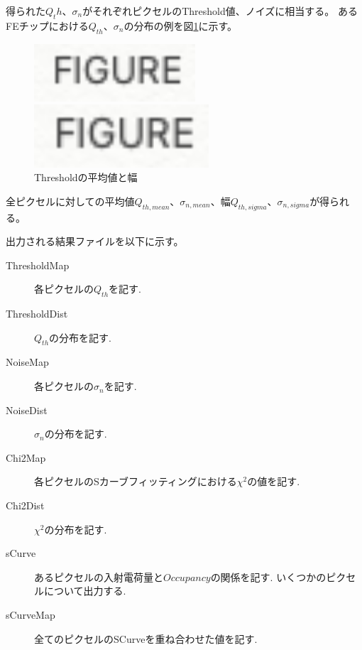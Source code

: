 得られた$Q_th$、$\sigma_n$がそれぞれピクセルのThreshold値、ノイズに相当する。
あるFEチップにおける$Q_{th}$、$\sigma_n$の分布の例を図\ref{threshold_mean_sigma}に示す。

\begin{figure}[bpt]\centering
  \begin{minipage}{0.4\hsize}
    \begin{center}
    \includegraphics[width=60mm]{figure}
    \end{center}
  \end{minipage}
  \begin{minipage}{0.4\hsize}
    \begin{center}
    \includegraphics[width=65mm]{figure}
    \end{center}
  \end{minipage}
  \caption[Thresholdの平均値と幅]{Thresholdの平均値と幅}
  \label{threshold_mean_sigma}
\end{figure}


全ピクセルに対しての平均値$Q_{th,mean}、\sigma_{n,mean}$、幅$Q_{th,sigma}、\sigma_{n,sigma}$が得られる。

出力される結果ファイルを以下に示す。
\begin{description}
  \item [ThresholdMap] 各ピクセルの$Q_{th}$を記す.
  \item [ThresholdDist] $Q_{th}$の分布を記す.
  \item [NoiseMap] 各ピクセルの$\sigma_n$を記す.
  \item [NoiseDist] $\sigma_n$の分布を記す. 
  \item [Chi2Map] 各ピクセルのSカーブフィッティングにおける$\chi^2$の値を記す.
  \item [Chi2Dist] $\chi^2$の分布を記す.
  \item [sCurve] あるピクセルの入射電荷量と$Occupancy$の関係を記す. いくつかのピクセルについて出力する.
  \item [sCurveMap] 全てのピクセルのSCurveを重ね合わせた値を記す.
\end{description}


